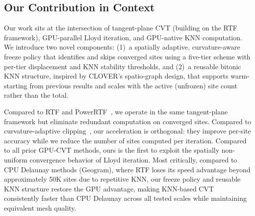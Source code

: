 \subsection{Our Contribution in Context}

Our work sits at the intersection of tangent-plane CVT (building on the RTF framework), GPU-parallel Lloyd iteration, and GPU-native KNN computation. We introduce two novel components: (1)~a spatially adaptive, curvature-aware freeze policy that identifies and skips converged sites using a five-tier scheme with per-tier displacement and KNN stability thresholds, and (2)~a reusable bitonic KNN structure, inspired by CLOVER's spatio-graph design, that supports warm-starting from previous results and scales with the active (unfrozen) site count rather than the total.

Compared to RTF and PowerRTF~\cite{yao2023rtf}, we operate in the same tangent-plane framework but eliminate redundant computation on converged sites. Compared to curvature-adaptive clipping~\cite{fei2025adaptive}, our acceleration is orthogonal: they improve per-site accuracy while we reduce the number of sites computed per iteration. Compared to all prior GPU-CVT methods, ours is the first to exploit the spatially non-uniform convergence behavior of Lloyd iteration. Most critically, compared to CPU Delaunay methods (Geogram), where RTF loses its speed advantage beyond approximately 50K sites due to repetitive KNN, our freeze policy and reusable KNN structure restore the GPU advantage, making KNN-based CVT consistently faster than CPU Delaunay across all tested scales while maintaining equivalent mesh quality.

